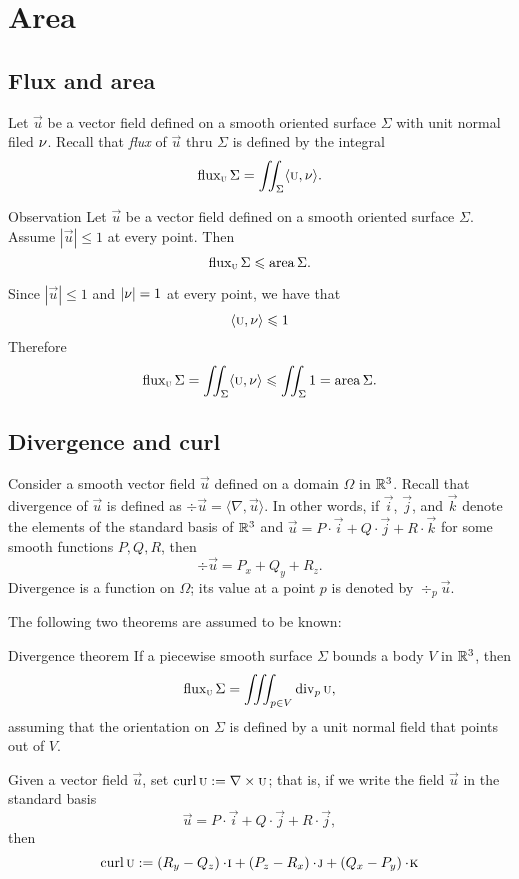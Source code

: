 \chapter{Area}

\section{Flux and area}

Let $\vec u$ be a vector field defined on a smooth oriented surface $\Sigma$ with unit normal filed $\nu$.
Recall that \emph{flux} of $\vec u$ thru $\Sigma$ is defined by the integral 
\[\mathop{\rm flux}\nolimits_{\textsc u}\Sigma=\iint_\Sigma \langle \textsc u,\nu\rangle.\]

\begin{thm}{Observation}\label{obs:flux}
Let $\vec u$ be a vector field defined on a smooth oriented surface $\Sigma$.
Assume $|\vec u|\le 1$ at every point.
Then 
\[\mathop{\rm flux}\nolimits_{\textsc u}\Sigma \leqslant \mathop{\rm area}\nolimits\Sigma.\]
\end{thm}

Since $|\vec u|\le 1$ and $|\nu|=1$ at every point,
we have that
\[\langle\textsc u,\nu\rangle\leqslant 1\]
Therefore 
\[\mathop{\rm flux}\nolimits_{\textsc u}\Sigma=\iint_\Sigma \langle\textsc u,\nu\rangle\leqslant \iint_\Sigma1=\mathop{\rm area}\nolimits\Sigma.\]
\qedsf
\section{Divergence and curl}


Consider a smooth vector field $\vec u$ defined on a domain $\Omega$ in $\mathbb{R}^3$.
Recall that divergence of $\vec u$ is defined as $\div\vec u=\langle \nabla,\vec u\rangle$.
In other words, if $\vec i$, $\vec j$, and $\vec k$ denote the elements of the standard basis of  $\mathbb{R}^3$ and
$\vec u=P\cdot \vec i+Q\cdot\vec j+R\cdot\vec k$
for some smooth functions $P,Q,R$,
then
\[\div\vec u= P_x+Q_y+R_z.\]
Divergence is a function on $\Omega$;
its value at a point $p$ is denoted by $\div_p\vec u$.

The following two theorems are assumed to be known:

\begin{thm}{Divergence theorem}\label{thm:div}
If a piecewise smooth surface $\Sigma$ bounds a body $V$ in $\mathbb{R}^3$, then
\[\mathop{\rm flux}\nolimits_{\textsc u}\Sigma=\iiint_{p\in V}\mathop{\rm div}\nolimits_p \textsc u,\]
assuming that the orientation on $\Sigma$ is defined by a unit normal field that points out of $V$.
\end{thm}

Given a vector field $\vec u$, set $\mathop{\rm curl}\nolimits \textsc u:=\nabla\times \textsc u$;
that is, if we write the field $\vec u$ in the standard basis 
\[\vec u=P\cdot \vec i+ Q\cdot\vec j+R\cdot \vec j,\]
then 
\[\curl \vec u
\df
\left(R_y-Q_z \right)\cdot \vec i 
+
\left(P_z-R_x\right) \cdot \vec j
+
\left (Q_x-P_y\right)\cdot \vec k \]

